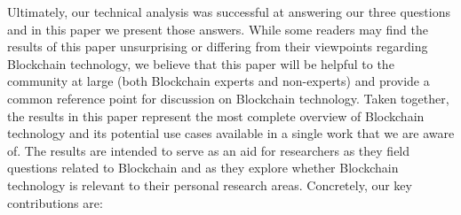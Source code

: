 

Ultimately, our technical analysis was successful at answering our three questions and in this paper we present those answers.
While some readers may find the results of this paper unsurprising or differing from their viewpoints regarding Blockchain technology, we believe that this paper will be helpful to the community at large (both Blockchain experts and non-experts) and provide a common reference point for discussion on Blockchain technology.
Taken together, the results in this paper represent the most complete overview of Blockchain technology and its potential use cases available in a single work that we are aware of.
The results are intended to serve as an aid for researchers as they field questions related to Blockchain and as they explore whether Blockchain technology is relevant to their personal research areas.
Concretely, our key contributions are:

